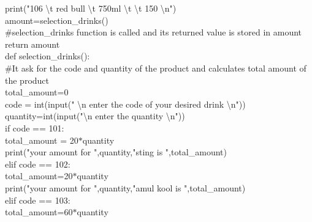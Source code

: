\documentclass[10pt,a4paper]{article}
\begin{document}
\begin{flushleft}
\hspace*{0.5cm}    print("106 \textbackslash t red bull \textbackslash t 750ml \textbackslash t \textbackslash t 150 \textbackslash n")\\
\hspace*{0.5cm}    amount=selection\_drinks()\\  \#selection\_drinks function is called and its returned value is stored in amount\\
 \hspace*{0.5cm}   return amount\\
\bigskip
def selection\_drinks():\\  \#It ask for the code and quantity of the product and calculates total amount of the product \\
\hspace*{0.5cm}    total\_amount=0\\
\hspace*{0.5cm}    code = int(input(" \textbackslash n enter the code of your desired drink \textbackslash n"))\\
\hspace*{0.5cm}    quantity=int(input("\textbackslash n enter the quantity \textbackslash n"))\\
\hspace*{0.5cm}    if code == 101:\\
\hspace*{0.5cm}\hspace*{0.5cm}        total\_amount = 20$\ast$quantity\\
\hspace*{0.5cm}\hspace*{0.5cm}        print("your amount for ",quantity,"sting is ",total\_amount)\\
\hspace*{0.5cm}    elif code == 102:\\
\hspace*{0.5cm}\hspace*{0.5cm}        total\_amount=20$\ast$quantity\\
\hspace*{0.5cm}\hspace*{0.5cm}        print("your amount for ",quantity,"amul kool is ",total\_amount)\\
\hspace*{0.5cm}    elif code == 103:\\
\hspace*{0.5cm}\hspace*{0.5cm}        total\_amount=60$\ast$quantity\\

\end{flushleft}
\end{document}
